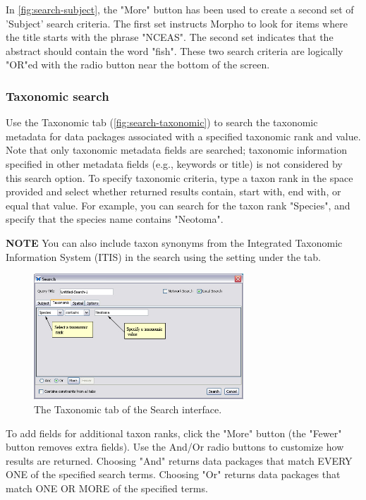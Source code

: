In \autoref{fig:search-subject}, the "More" button has been used to
create a second set of 'Subject' search criteria. The first set
instructs Morpho to look for items where the title starts with the
phrase "NCEAS". The second set indicates that the abstract should
contain the word "fish". These two search criteria are logically "OR"ed
with the radio button near the bottom of the screen.

\subsubsection[Taxonomic]{Taxonomic search} \label{sec:search-taxonomic}

Use the Taxonomic tab (\autoref{fig:search-taxonomic}) to search the
taxonomic metadata for data packages associated with a specified
taxonomic rank and value. Note that only taxonomic metadata fields are
searched; taxonomic information specified in other metadata fields
(e.g., keywords or title) is not considered by this search option. To
specify taxonomic criteria, type a taxon rank in the space provided and
select whether returned results contain, start with, end with, or equal
that value. For example, you can search for the taxon rank "Species",
and specify that the species name contains "Neotoma".

\begin{shaded}
  \textbf{NOTE} You can also include taxon synonyms from the Integrated
  Taxonomic Information System (ITIS) in the search using the setting
  under the  tab.
\end{shaded}

\begin{figure}
  \centering
    \includegraphics[width=0.7\textwidth]{images/search-taxonomic.jpg}
  \caption{The Taxonomic tab of the Search interface.}
  \label{fig:search-taxonomic}
\end{figure}

To add fields for additional taxon ranks, click the "More" button (the
"Fewer" button removes extra fields). Use the And/Or radio buttons to
customize how results are returned. Choosing "And" returns data packages
that match EVERY ONE of the specified search terms. Choosing "Or"
returns data packages that match ONE OR MORE of the specified terms.

